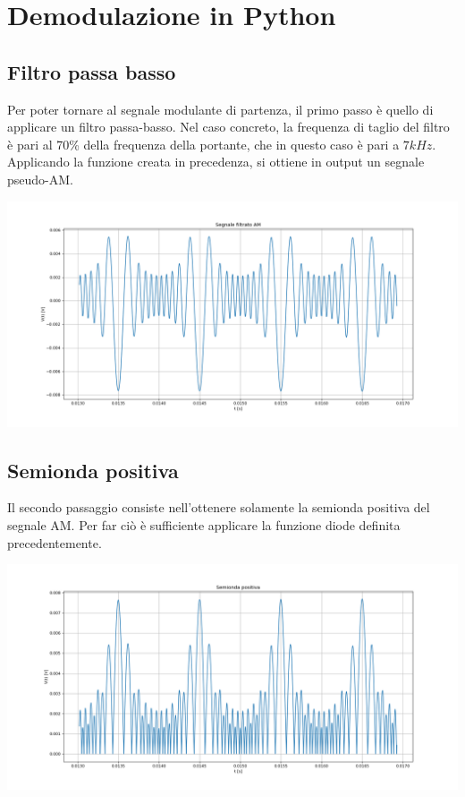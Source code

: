 \documentclass{article}
\begin{document}
\section{Demodulazione in Python}

\subsection{Filtro passa basso}
Per poter tornare al segnale modulante di partenza, il primo passo è quello di applicare un filtro passa-basso.
Nel caso concreto, la frequenza di taglio del filtro è pari al 70\% della frequenza della portante, che in 
questo caso è pari a $7 kHz$.
\\
Applicando la funzione creata in precedenza, si ottiene in output un segnale pseudo-AM.

\begin{center}
    \includegraphics[width=\textwidth]{filtrato.png}
\end{center}

\subsection{Semionda positiva}
Il secondo passaggio consiste nell'ottenere solamente la semionda positiva del segnale AM. Per far ciò è sufficiente
applicare la funzione diode definita precedentemente.

\begin{center}
    \includegraphics[width=\textwidth]{positivo.png}
\end{center}
\end{document}
